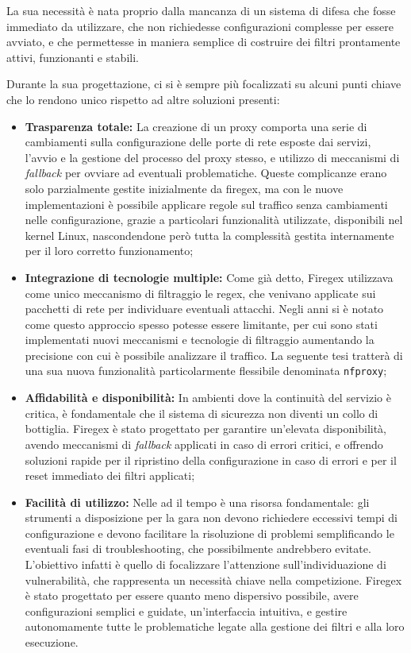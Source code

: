 La sua necessità è nata proprio dalla mancanza di un sistema di difesa che fosse immediato da utilizzare, che non richiedesse configurazioni complesse per essere avviato, e che permettesse in maniera semplice di costruire dei filtri prontamente attivi, funzionanti e stabili.

Durante la sua progettazione, ci si è sempre più focalizzati su alcuni punti chiave che lo rendono unico rispetto ad altre soluzioni presenti:

\begin{itemize}
    \setlength{\itemsep}{1pt}
    \setlength{\parskip}{1pt}
    \item \textbf{Trasparenza totale:} La creazione di un proxy comporta una serie di cambiamenti sulla configurazione delle porte di rete esposte dai servizi, l'avvio e la gestione del processo del proxy stesso, e utilizzo di meccanismi di \textit{fallback} per ovviare ad eventuali problematiche. Queste complicanze erano solo parzialmente gestite inizialmente da firegex, ma con le nuove implementazioni è possibile applicare regole sul traffico senza cambiamenti nelle configurazione, grazie a particolari funzionalità utilizzate, disponibili nel kernel Linux, nascondendone però tutta la complessità gestita internamente per il loro corretto funzionamento;
    \item \textbf{Integrazione di tecnologie multiple:} Come già detto, Firegex utilizzava come unico meccanismo di filtraggio le \gls{regex}, che venivano applicate sui pacchetti di rete per individuare eventuali attacchi. Negli anni si è notato come questo approccio spesso potesse essere limitante, per cui sono stati implementati nuovi meccanismi e tecnologie di filtraggio aumentando la precisione con cui è possibile analizzare il traffico. La seguente tesi tratterà di una sua nuova funzionalità particolarmente flessibile denominata \texttt{\gls{nfproxy}};
    \item \textbf{Affidabilità e disponibilità:} In ambienti dove la continuità del servizio è critica, è fondamentale che il sistema di sicurezza non diventi un collo di bottiglia. Firegex è stato progettato per garantire un’elevata disponibilità, avendo meccanismi di \textit{fallback} applicati in caso di errori critici, e offrendo soluzioni rapide per il ripristino della configurazione in caso di errori e per il reset immediato dei filtri applicati;
    \item \textbf{Facilità di utilizzo:} Nelle \gls{ad} il tempo è una risorsa fondamentale: gli strumenti a disposizione per la gara non devono richiedere eccessivi tempi di configurazione e devono facilitare la risoluzione di problemi semplificando le eventuali fasi di troubleshooting, che possibilmente andrebbero evitate. L'obiettivo infatti è quello di focalizzare l'attenzione sull'individuazione di vulnerabilità, che rappresenta un necessità chiave nella competizione. Firegex è stato progettato per essere quanto meno dispersivo possibile, avere configurazioni semplici e guidate, un'interfaccia intuitiva, e gestire autonomamente tutte le problematiche legate alla gestione dei filtri e alla loro esecuzione.
\end{itemize}

